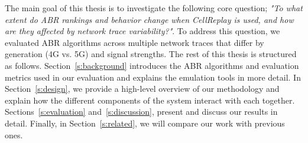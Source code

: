 The main goal of this thesis is to investigate the following core question; \textit{"To what extent do ABR rankings and behavior change when CellReplay is used, and how are they affected by network trace variability?"}. To address this question, we evaluated ABR algorithms across multiple network traces that differ by generation (4G vs. 5G) and signal strengths. The rest of this thesis is structured as follows. Section~\ref{s:background} introduces the ABR algorithms and evaluation metrics used in our evaluation and explains the emulation tools in more detail. In Section~\ref{s:design}, we provide a high-level overview of our methodology and explain how the different components of the system interact with each together. Sections~\ref{s:evaluation} and~\ref{s:discussion}, present and discuss our results in detail. Finally, in Section~\ref{s:related}, we will compare our work with previous ones.
